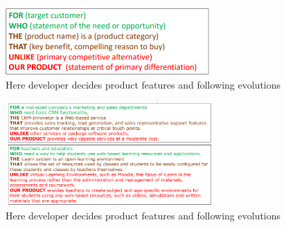 \documentclass[10pt,a4paper]{report}
\begin{document}
\begin{figure}[h]
	\centering
	\includegraphics[width=0.7\textwidth]{image04}
	\caption{Here developer decides product features and following evolutions}
	\label{image04}
\end{figure}

\begin{figure}[h]
	\centering
	\includegraphics[width=0.7\textwidth]{image05}
	\caption{Here developer decides product features and following evolutions}
	\label{image05}
\end{figure}
\end{document}
